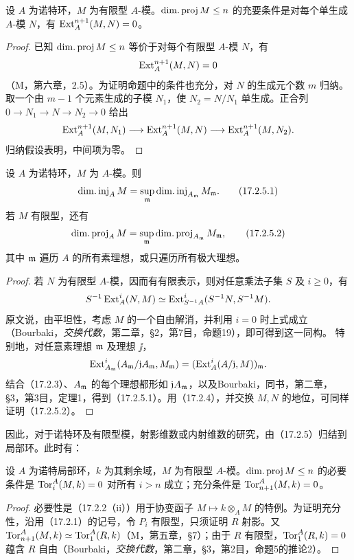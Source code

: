 设 $A$ 为诺特环，$M$ 为有限型 $A$-模。$\operatorname{dim.proj} M\leq n$ 的充要条件是对每个单生成 $A$-模 $N$，有 $\operatorname{Ext}_A^{n+1}(M,N)=0$。
\begin{proof}
已知 $\operatorname{dim.proj} M\leq n$ 等价于对每个有限型 $A$-模 $N$，有
\[
 \operatorname{Ext}_A^{n+1}(M,N)=0
\]
（M，第六章，2.5）。为证明命题中的条件也充分，对 $N$ 的生成元个数 $m$ 归纳。取一个由 $m-1$ 个元素生成的子模 $N_1$，使 $N_2=N/N_1$ 单生成。正合列 $0\to N_1\to N\to N_2\to0$ 给出
\[
 \operatorname{Ext}_A^{n+1}(M,N_1)\longrightarrow\operatorname{Ext}_A^{n+1}(M,N)
 \longrightarrow\operatorname{Ext}_A^{n+1}(M,N_2).
\]
归纳假设表明，中间项为零。
\end{proof}

设 $A$ 为诺特环，$M$ 为 $A$-模。则
\begin{equation}
 \operatorname{dim.inj}_A M=\sup_{\mathfrak m}\operatorname{dim.inj}_{A_{\mathfrak m}}M_{\mathfrak m}.
 \tag{17.2.5.1}
\end{equation}
若 $M$ 有限型，还有
\begin{equation}
 \operatorname{dim.proj}_A M=\sup_{\mathfrak m}\operatorname{dim.proj}_{A_{\mathfrak m}}M_{\mathfrak m},
 \tag{17.2.5.2}
\end{equation}
其中 $\mathfrak m$ 遍历 $A$ 的所有素理想，或只遍历所有极大理想。
\begin{proof}
若 $N$ 为有限型 $A$-模，因而有有限表示，则对任意乘法子集 $S$ 及 $i\geq0$，有
\[
 S^{-1}\operatorname{Ext}_A^i(N,M)
 \simeq\operatorname{Ext}_{S^{-1}A}^i(S^{-1}N,S^{-1}M).
\]
原文说，由平坦性，考虑 $M$ 的一个自由解消，并利用 $i=0$ 时上式成立（Bourbaki，\textit{交换代数}，第二章，§2，第7目，命题19），即可得到这一同构。
特别地，对任意素理想 $\mathfrak m$ 及理想 $\jj$，
\[
 \operatorname{Ext}_{A_{\mathfrak m}}^i(A_{\mathfrak m}/\mathfrak j A_{\mathfrak m},M_{\mathfrak m})
 =(\operatorname{Ext}_A^i(A/\mathfrak j,M))_{\mathfrak m}.
\]
结合（17.2.3）、$A_{\mathfrak m}$ 的每个理想都形如 $\mathfrak j A_{\mathfrak m}$，以及Bourbaki，同书，第二章，§3，第3目，定理1，得到（17.2.5.1）。用（17.2.4），并交换 $M,N$ 的地位，可同样证明（17.2.5.2）。
\end{proof}
因此，对于诺特环及有限型模，射影维数或内射维数的研究，由（17.2.5）归结到局部环。此时有：

设 $A$ 为诺特局部环，$k$ 为其剩余域，$M$ 为有限型 $A$-模。$\operatorname{dim.proj} M\leq n$ 的必要条件是 $\operatorname{Tor}_i^A(M,k)=0$ 对所有 $i>n$ 成立；充分条件是 $\operatorname{Tor}_{n+1}^A(M,k)=0$。
\begin{proof}
必要性是（17.2.2（ii））用于协变函子 $M\mapsto k\otimes_A M$ 的特例。为证明充分性，沿用（17.2.1）的记号，令 $P_i$ 有限型，只须证明 $R$ 射影。又 $\operatorname{Tor}_{n+1}^A(M,k)\simeq\operatorname{Tor}_1^A(R,k)$（M，第五章，§7）；由于 $R$ 有限型，$\operatorname{Tor}_1^A(R,k)=0$ 蕴含 $R$ 自由（Bourbaki，\textit{交换代数}，第二章，§3，第2目，命题5的推论2）。
\end{proof}

